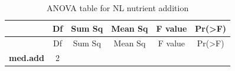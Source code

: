 \documentclass[]{article}
\begin{document}
\begin{longtable}[]{@{}cccccc@{}}
\caption{ANOVA table for NL nutrient addition}\tabularnewline
\toprule
\begin{minipage}[b]{0.19\columnwidth}\centering\strut
~
\strut\end{minipage} &
\begin{minipage}[b]{0.06\columnwidth}\centering\strut
Df
\strut\end{minipage} &
\begin{minipage}[b]{0.10\columnwidth}\centering\strut
Sum Sq
\strut\end{minipage} &
\begin{minipage}[b]{0.12\columnwidth}\centering\strut
Mean Sq
\strut\end{minipage} &
\begin{minipage}[b]{0.12\columnwidth}\centering\strut
F value
\strut\end{minipage} &
\begin{minipage}[b]{0.12\columnwidth}\centering\strut
Pr(\textgreater{}F)
\strut\end{minipage}\tabularnewline
\midrule
\endfirsthead
\toprule
\begin{minipage}[b]{0.19\columnwidth}\centering\strut
~
\strut\end{minipage} &
\begin{minipage}[b]{0.06\columnwidth}\centering\strut
Df
\strut\end{minipage} &
\begin{minipage}[b]{0.10\columnwidth}\centering\strut
Sum Sq
\strut\end{minipage} &
\begin{minipage}[b]{0.12\columnwidth}\centering\strut
Mean Sq
\strut\end{minipage} &
\begin{minipage}[b]{0.12\columnwidth}\centering\strut
F value
\strut\end{minipage} &
\begin{minipage}[b]{0.12\columnwidth}\centering\strut
Pr(\textgreater{}F)
\strut\end{minipage}\tabularnewline
\midrule
\endhead
\begin{minipage}[t]{0.19\columnwidth}\centering\strut
\textbf{med.add}
\strut\end{minipage} &
\begin{minipage}[t]{0.06\columnwidth}\centering\strut
2
\strut\end{minipage} &
\begin{minipage}[t]{0.10\columnwidth}\centering\strut

\end{minipage}
\end{longtable}
\end{document}
